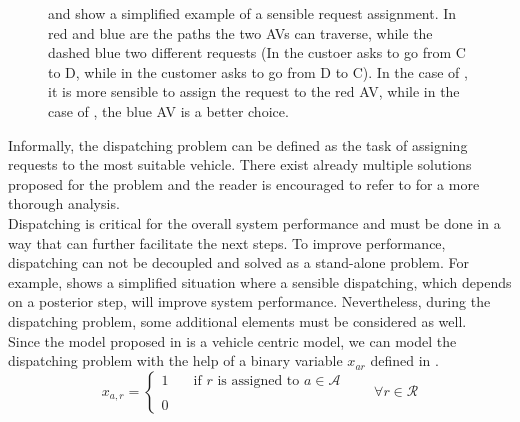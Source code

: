 \begin{figure}
\begin{subfigure}{0.5\linewidth}
		\caption{}
		\label{fig:req_notassignable}
	\end{subfigure}
	\caption[Example of a Sensible Request assignment]{ and  show a simplified example of a sensible request assignment. In red and blue are the paths the two AVs can traverse, while the dashed blue two different requests (In  the custoer asks to go from C to D, while in  the customer asks to go from D to C). In the case of , it is more sensible to assign the request to the red AV, while in the case of , the blue AV is a better choice. }
	\label{fig:sens_assignment}
\end{figure}

Informally, the dispatching problem can be defined as the task of assigning requests to the most suitable vehicle. There exist already multiple solutions proposed for the problem and the reader is encouraged to refer to  for a more thorough analysis. \\
Dispatching is critical for the overall system performance and must be done in a way that can further facilitate the next steps. To improve performance, dispatching can not be decoupled and solved as a stand-alone problem. For example,  shows a simplified situation where a sensible dispatching, which depends on a posterior step, will improve system performance. Nevertheless, during the dispatching problem, some additional elements must be considered as well. \\
Since the model proposed in  is a vehicle centric model, we can model the dispatching problem with the help of a binary variable $x_{ar}$ defined in . 
\begin{equation*}
	x_{a,r} = 
	\begin{cases} 
		1 & \quad \text{if $r$ is assigned to } a \in \mathcal{A}\\
		\\
		0
	\end{cases}
	\quad\quad \forall r \in \mathcal{R}
	\label{eq:dispatching_var}
\end{equation*}

